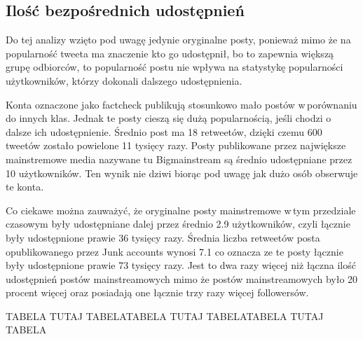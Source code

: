 \subsection{Ilość bezpośrednich udostępnień }
Do tej analizy wzięto pod uwagę jedynie oryginalne posty, ponieważ mimo że na popularność tweeta ma znaczenie kto go udostępnił, bo to zapewnia większą grupę odbiorców, to popularność postu nie wpływa na statystykę popularności użytkowników, którzy dokonali dalszego udostępnienia. 
\par
Konta oznaczone jako factcheck publikują stosunkowo mało postów w\,porównaniu do innych klas. Jednak te posty cieszą się dużą popularnością, jeśli chodzi o dalsze ich udostępnienie. Średnio post ma 18 retweetów, dzięki czemu 600 tweetów zostało powielone 11 tysięcy razy. Posty publikowane przez największe mainstremowe media nazywane tu Bigmainstream są średnio udostępniane przez 10 użytkowników. Ten wynik nie dziwi biorąc pod uwagę jak dużo osób obserwuje te konta.  
\par
Co ciekawe można zauważyć, że oryginalne posty mainstremowe w\,tym przedziale czasowym były udostępniane dalej przez średnio 2.9 użytkowników, czyli łącznie były udostępnione prawie 36 tysięcy razy. Średnia liczba retweetów posta opublikowanego przez Junk accounts wynosi 7.1 co oznacza ze te posty łącznie były udostępnione prawie 73 tysięcy razy. Jest to dwa razy więcej niż łączna ilość udostępnień postów mainstreamowych mimo że postów mainstreamowych było 20 procent więcej oraz posiadają one łącznie trzy razy więcej followersów. 



TABELA TUTAJ TABELATABELA TUTAJ TABELATABELA TUTAJ TABELA
